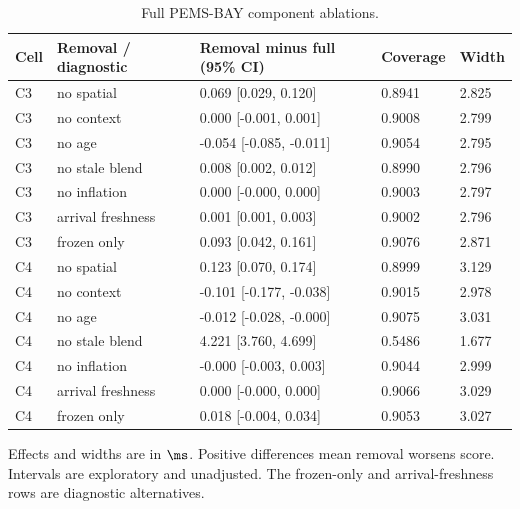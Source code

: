 \begin{table}[p]
\caption{Full PEMS-BAY component ablations.}\label{tab:ablation-pems}
\centering\small
\begin{tabular}{lllll}\toprule
Cell & Removal / diagnostic & Removal minus full (95\% CI) & Coverage & Width \\\midrule
C3 & no spatial & 0.069 [0.029, 0.120] & 0.8941 & 2.825 \\
C3 & no context & 0.000 [-0.001, 0.001] & 0.9008 & 2.799 \\
C3 & no age & -0.054 [-0.085, -0.011] & 0.9054 & 2.795 \\
C3 & no stale blend & 0.008 [0.002, 0.012] & 0.8990 & 2.796 \\
C3 & no inflation & 0.000 [-0.000, 0.000] & 0.9003 & 2.797 \\
C3 & arrival freshness & 0.001 [0.001, 0.003] & 0.9002 & 2.796 \\
C3 & frozen only & 0.093 [0.042, 0.161] & 0.9076 & 2.871 \\
C4 & no spatial & 0.123 [0.070, 0.174] & 0.8999 & 3.129 \\
C4 & no context & -0.101 [-0.177, -0.038] & 0.9015 & 2.978 \\
C4 & no age & -0.012 [-0.028, -0.000] & 0.9075 & 3.031 \\
C4 & no stale blend & 4.221 [3.760, 4.699] & 0.5486 & 1.677 \\
C4 & no inflation & -0.000 [-0.003, 0.003] & 0.9044 & 2.999 \\
C4 & arrival freshness & 0.000 [-0.000, 0.000] & 0.9066 & 3.029 \\
C4 & frozen only & 0.018 [-0.004, 0.034] & 0.9053 & 3.027 \\
\bottomrule\end{tabular}
\par\smallskip\footnotesize Effects and widths are in $\ms$. Positive differences mean removal worsens score. Intervals are exploratory and unadjusted. The frozen-only and arrival-freshness rows are diagnostic alternatives.
\end{table}\clearpage
